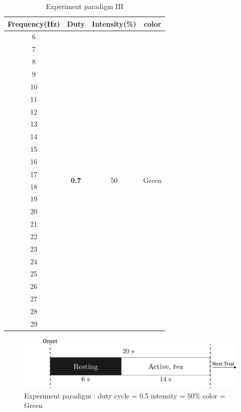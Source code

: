 \begin{table}[ht]
\centering
\begin{tabular}{| c | c | c | c |}
	\hline 
    \textbf{Frequency(Hz)}&\textbf{Duty}&\textbf{Intensity(\%)}&\textbf{color}\\
    \hline
    6&\multirow{24}{*}{\textbf{0.7}}&
    \multirow{24}{*}{50}&
    \multirow{24}{*}{Green}\\
    \cline{1-1}
    7&&&\\\cline{1-1}
    8&&&\\ \cline{1-1}
    9&&&\\ \cline{1-1}
    10&&&\\ \cline{1-1}
    11&&&\\ \cline{1-1}
    12&&&\\ \cline{1-1}
    13&&&\\\cline{1-1}
    14&&&\\ \cline{1-1}
    15&&&\\ \cline{1-1}
    16&&&\\ \cline{1-1}
    17&&&\\ \cline{1-1}
    18&&&\\ \cline{1-1}
    19&&&\\ \cline{1-1}
    20&&&\\ \cline{1-1}
    21&&&\\ \cline{1-1}
    22&&&\\ \cline{1-1}
    23&&&\\ \cline{1-1}
    24&&&\\ \cline{1-1}
    25&&&\\ \cline{1-1}
    26&&&\\ \cline{1-1}
    27&&&\\ \cline{1-1}
    28&&&\\ \cline{1-1}
    29&&&\\ 
    \hline
	\end{tabular}       
\caption{Experiment paradigm III}
\label{table:paradigm_3}
\end{table}

\begin{figure}[ht]
	\centering
	\includegraphics[scale = 0.3]{chapter7/scale.pdf}
	\caption{Experiment paradigm : duty cycle = 0.5 intensity = 50\% color = Green}
    \label{fig:para}
\end{figure}

